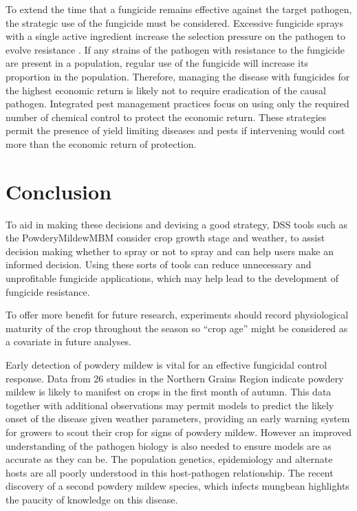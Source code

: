 \documentclass[agronomy,article,submit,moreauthors,pdftex]{mdpi}
\begin{document}
To extend the time that a fungicide remains effective against the target pathogen, the strategic use of the fungicide must be considered.
Excessive fungicide sprays with a single active ingredient increase the selection pressure on the pathogen to evolve resistance \citep{Brent2007}.
If any strains of the pathogen with resistance to the fungicide are present in a population, regular use of the fungicide will increase its proportion in the population.
Therefore, managing the disease with fungicides for the highest economic return is likely not to require eradication of the causal pathogen.
Integrated pest management practices focus on using only the required number of chemical control to protect the economic return.
These strategies permit the presence of yield limiting diseases and pests if intervening would cost more than the economic return of protection.

\hypertarget{conclusion}{%
\section{Conclusion}\label{conclusion}}

To aid in making these decisions and devising a good strategy, DSS tools such as the PowderyMildewMBM consider crop growth stage and weather, to assist decision making whether to spray or not to spray \citep{Diggle} and can help users make an informed decision.
Using these sorts of tools can reduce unnecessary and unprofitable fungicide applications, which may help lead to the development of fungicide resistance.

To offer more benefit for future research, experiments should record physiological maturity of the crop throughout the season so ``crop age'' might be considered as a covariate in future analyses.

Early detection of powdery mildew is vital for an effective fungicidal control response.
Data from 26 studies in the Northern Grains Region indicate powdery mildew is likely to manifest on crops in the first month of autumn.
This data together with additional observations may permit models to predict the likely onset of the disease given weather parameters, providing an early warning system for growers to scout their crop for signs of powdery mildew.
However an improved understanding of the pathogen biology is also needed to ensure models are as accurate as they can be.
The population genetics, epidemiology and alternate hosts are all poorly understood in this host-pathogen relationship.
The recent discovery of a second powdery mildew species, which infects mungbean highlights the paucity of knowledge on this disease.
\end{document}
